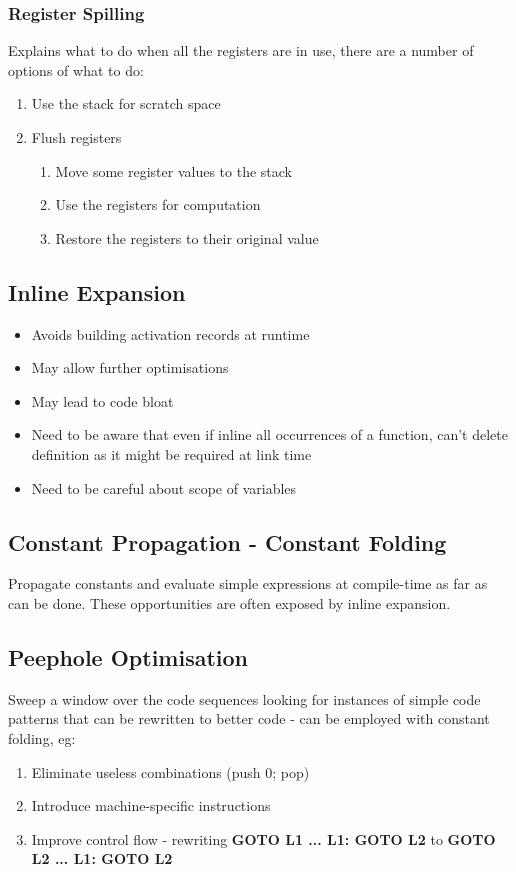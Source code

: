 \documentclass{article}
\newenvironment{pros}{\par\color[rgb]{0.066, 0.4, 0.129}}{\par}
\newenvironment{cons}{\par\color{red}}{\par}
\begin{document}
\subsubsection{Register Spilling}
Explains what to do when all the registers are in use, there are a number of options of what to do:
\begin{enumerate}
	\item Use the stack for scratch space
	\item Flush registers
	\begin{enumerate}
		\item Move some register values to the stack
		\item Use the registers for computation
		\item Restore the registers to their original value
	\end{enumerate}
\end{enumerate}


\subsection{Inline Expansion}
\begin{itemize}
\begin{pros}
	\item Avoids building activation records at runtime
	\item May allow further optimisations
\end{pros}
\begin{cons}
	\item May lead to code bloat
\end{cons}
	\item Need to be aware that even if inline all occurrences of a function, can't delete definition as it might be required at link time
	
	\item Need to be careful about scope of variables
\end{itemize}

\subsection{Constant Propagation - Constant Folding}
Propagate constants and evaluate simple expressions at compile-time as far as can be done. These opportunities are often exposed by inline expansion.


\subsection{Peephole Optimisation}
Sweep a window over the code sequences looking for instances of simple code patterns that can be rewritten to better code - can be employed with constant folding, eg:
\begin{enumerate}
	\item Eliminate useless combinations (push 0; pop)
	\item Introduce machine-specific instructions
	\item Improve control flow - rewriting \textbf{GOTO L1 ... L1: GOTO L2} to \textbf{GOTO L2 ... L1: GOTO L2}
\end{enumerate}
\end{document}
